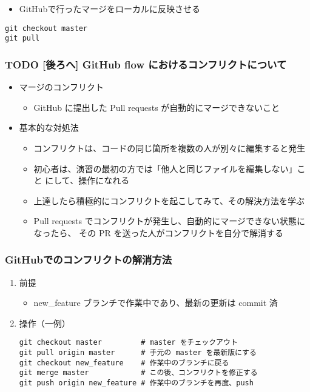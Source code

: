 \documentclass[a4paper,twoside,twocolumn]{bxjsarticle}
\begin{document}
\begin{itemize}
\item GitHubで行ったマージをローカルに反映させる
\end{itemize}

\begin{verbatim}
git checkout master
git pull
\end{verbatim}

\subsubsection{{\bfseries\sffamily TODO} [後ろへ] GitHub flow におけるコンフリクトについて}
\label{sec-3-1-6}
\begin{itemize}
\item マージのコンフリクト
\begin{itemize}
\item GitHub に提出した Pull requests が自動的にマージできないこと
\end{itemize}
\item 基本的な対処法
\begin{itemize}
\item コンフリクトは、コードの同じ箇所を複数の人が別々に編集すると発生
\item 初心者は、演習の最初の方では「他人と同じファイルを編集しない」こと
にして、操作になれる
\item 上達したら積極的にコンフリクトを起こしてみて、その解決方法を学ぶ
\item Pull requests でコンフリクトが発生し、自動的にマージできない状態に
なったら、 その PR を送った人がコンフリクトを自分で解消する
\end{itemize}
\end{itemize}
\subsubsection{GitHubでのコンフリクトの解消方法}
\label{sec-3-1-7}
\begin{enumerate}
\item 前提
\label{sec-3-1-7-1}
\begin{itemize}
\item new\_feature ブランチで作業中であり、最新の更新は commit 済
\end{itemize}

\item 操作（一例）
\label{sec-3-1-7-2}

\begin{verbatim}
git checkout master         # master をチェックアウト
git pull origin master      # 手元の master を最新版にする
git checkout new_feature    # 作業中のブランチに戻る
git merge master            # この後、コンフリクトを修正する
git push origin new_feature # 作業中のブランチを再度、push
\end{verbatim}
\end{enumerate}
\end{document}
